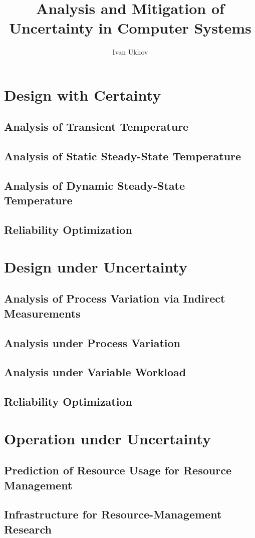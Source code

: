 \documentclass[english]{style}
\title{
  Analysis and Mitigation of\\[0.3em]
  Uncertainty in Computer Systems
}
\author{Ivan Ukhov}
\begin{document}
\nocite{ukhov2012, ukhov2014a, ukhov2014b, ukhov2015, ukhov2017}



\chapter{Design with Certainty}
\section{Analysis of Transient Temperature}
\section{Analysis of Static Steady-State Temperature}
\section{Analysis of Dynamic Steady-State Temperature}
\section{Reliability Optimization}

\chapter{Design under Uncertainty}
\section{Analysis of Process Variation via Indirect Measurements}
\section{Analysis under Process Variation}
\section{Analysis under Variable Workload}
\section{Reliability Optimization}

\chapter{Operation under Uncertainty}
\section{Prediction of Resource Usage for Resource Management}
\section{Infrastructure for Resource-Management Research}



\printbibliography
\end{document}
